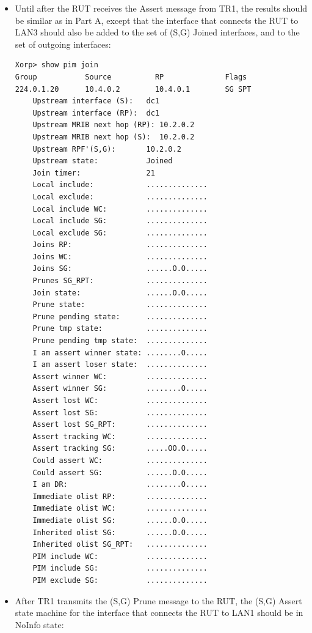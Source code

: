 \documentclass[11pt]{report}
\begin{document}

\begin{itemize}

  \item Until after the RUT receives the Assert message from TR1, the results
  should be similar as in Part A, except that the interface that connects the
  RUT to LAN3 should also be added to the set of (S,G) Joined interfaces, and
  to the set of outgoing interfaces:

\begin{verbatim}
Xorp> show pim join 
Group           Source          RP              Flags
224.0.1.20      10.4.0.2        10.4.0.1        SG SPT 
    Upstream interface (S):   dc1
    Upstream interface (RP):  dc1
    Upstream MRIB next hop (RP): 10.2.0.2
    Upstream MRIB next hop (S):  10.2.0.2
    Upstream RPF'(S,G):       10.2.0.2
    Upstream state:           Joined 
    Join timer:               21
    Local include:            ..............
    Local exclude:            ..............
    Local include WC:         ..............
    Local include SG:         ..............
    Local exclude SG:         ..............
    Joins RP:                 ..............
    Joins WC:                 ..............
    Joins SG:                 ......O.O.....
    Prunes SG_RPT:            ..............
    Join state:               ......O.O.....
    Prune state:              ..............
    Prune pending state:      ..............
    Prune tmp state:          ..............
    Prune pending tmp state:  ..............
    I am assert winner state: ........O.....
    I am assert loser state:  ..............
    Assert winner WC:         ..............
    Assert winner SG:         ........O.....
    Assert lost WC:           ..............
    Assert lost SG:           ..............
    Assert lost SG_RPT:       ..............
    Assert tracking WC:       ..............
    Assert tracking SG:       .....OO.O.....
    Could assert WC:          ..............
    Could assert SG:          ......O.O.....
    I am DR:                  ........O.....
    Immediate olist RP:       ..............
    Immediate olist WC:       ..............
    Immediate olist SG:       ......O.O.....
    Inherited olist SG:       ......O.O.....
    Inherited olist SG_RPT:   ..............
    PIM include WC:           ..............
    PIM include SG:           ..............
    PIM exclude SG:           ..............
\end{verbatim}

  \item After TR1 transmits the (S,G) Prune message to the RUT, the (S,G)
  Assert state machine for the interface that connects the RUT to LAN1 should
  be in NoInfo state:


\end{itemize}
\end{document}
